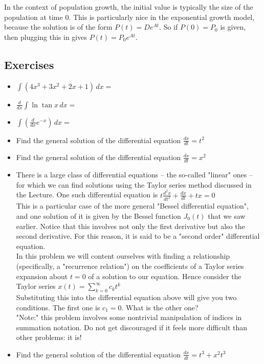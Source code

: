 \documentclass[twoside,openright,titlepage,a4paper]{book}
\begin{document}
\begin{sloppypar}
In the context of population growth, the initial value is typically the size of the population at time 0. This is particularly nice in the exponential growth model, because the solution is of the form $P(t) = De^{At}$. So if $P(0) = P_0$ is given, then plugging this in gives $P(t) = P_0e^{At}$.

\subsection{Exercises}

\begin{itemize}
\item $ \displaystyle \int (4x^3 + 3x^2 + 2x + 1) \, dx = $
\item $ \displaystyle \frac{d}{dx} \int \ln \tan x \, dx = $
\item $ \displaystyle \int \left( \frac{d}{dx} e^{-x} \right) \, dx = $
\item Find the general solution of the differential equation $ \displaystyle \frac{dx}{dt} = t^2 $
\item Find the general solution of the differential equation $ \displaystyle \frac{dx}{dt} = x^2 $
\item There is a large class of differential equations -- the so-called "linear" ones -- for which we can find solutions using the Taylor series method discussed in the Lecture. One such differential equation is $ \displaystyle t \frac{d^2x}{dt^2} + \frac{dx}{dt} + tx = 0 $\\
This is a particular case of the more general "Bessel differential equation", and one solution of it is given by the Bessel function $J_0(t)$ that we saw earlier. Notice that this involves not only the first derivative but also the second derivative. For this reason, it is said to be a "second order" differential equation.\\
In this problem we will content ourselves with finding a relationship (specifically, a "recurrence relation") on the coefficients of a Taylor series expansion about $t=0$ of a solution to our equation. Hence consider the Taylor series
$ \displaystyle x(t) = \sum_{k=0}^\infty c_k t^k $\\
Substituting this into the differential equation above will give you two conditions. The first one is $c_1 = 0$. What is the other one?\\
"Note:" this problem involves some nontrivial manipulation of indices in summation notation. Do not get discouraged if it feels more difficult than other problems: it is!
\item Find the general solution of the differential equation $ \displaystyle \frac{dx}{dt} = t^3+x^2t^3 $
\end{itemize}


\end{sloppypar}
\end{document}
